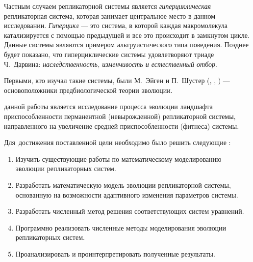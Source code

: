 Частным случаем репликаторной системы является \textit{гиперциклическая} репликаторная система, которая занимает центральное место в данном исследовании. \textit{Гиперцикл} --- это система, в которой каждая макромолекула катализируется с помощью предыдущей и все это происходит в замкнутом цикле. Данные системы являются примером альтруистического типа поведения. Позднее будет показано, что гиперциклические системы удовлетворяют триаде Ч.~Дарвина: \textit{наследственность, изменчивость и естественный отбор}.

Первыми, кто изучал такие системы, были М.~Эйген и П.~Шустер (\cite{Eig4}, \cite{Eig5}, \cite{Shuster2}) --- основоположники предбиологической теории эволюции.

{\aim} данной работы является исследование процесса эволюции ландшафта приспособленности перманентной (невырожденной) репликаторной системы, направленного на увеличение средней приспособленности (фитнеса) системы.


Для~достижения поставленной цели необходимо было решить следующие {\tasks}:
\begin{enumerate}
  \item Изучить существующие работы по математическому моделированию эволюции
репликаторных систем.
  \item Разработать математическую модель эволюции репликаторной системы, основанную на возможности адаптивного изменения параметров системы.
  \item Разработать численный метод решения соответствующих систем уравнений.
  \item Программно реализовать численные методы моделирования эволюции репликаторных систем.
  \item Проанализировать и проинтерпретировать полученные результаты.
\end{enumerate}


